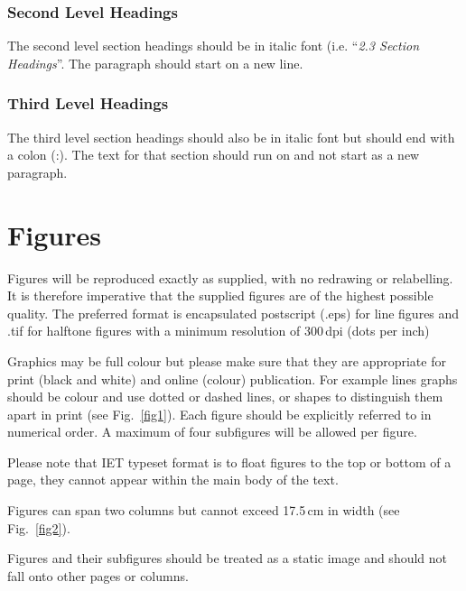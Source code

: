 \documentclass{cta-author}
\begin{document}
\begin{figure*}[!b]
\caption{Sample graph spaning two columns\label{fig2}}
\end{figure*}

\subsubsection{Second Level Headings}\label{subsubsec5.3.2}

The second level section headings should be in italic font
(i.e. ``\textit{2.3 Section Headings}''. The paragraph
should start on a new line.

\subsubsection{Third Level Headings}\label{subsubsec5.3.3}

The third level section headings should also be in italic
font but should end with a colon (:). The text for that
section should run on and not start as a new paragraph.


\section{Figures}\label{sec6}

Figures will be reproduced exactly as supplied, with no
redrawing or relabelling. It is therefore imperative that
the supplied figures are of the highest possible quality.
The preferred format is encapsulated postscript (.eps) for
line figures and .tif for halftone figures with a minimum
resolution of 300\,dpi (dots per inch)

Graphics may be full colour but please make sure that they
are appropriate for print (black and white) and online
(colour) publication. For example lines graphs should be
colour and use dotted or dashed lines, or shapes to
distinguish them apart in print (see Fig.~\ref{fig1}). Each
figure should be explicitly referred to in numerical order.
A maximum of four subfigures will be allowed per figure.

Please note that IET typeset format is to float figures to
the top or bottom of a page, they cannot appear within the
main body of the text.

Figures can span two columns but cannot exceed 17.5\,cm in
width (see Fig.~\ref{fig2}).

Figures and their subfigures should be treated as a static
image and should not fall onto other pages or columns.
\end{document}
